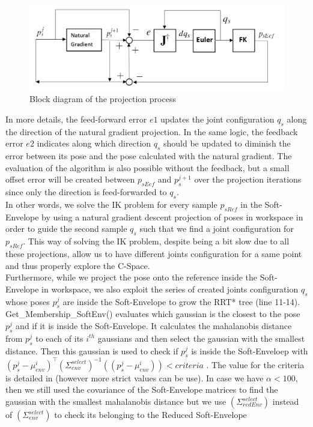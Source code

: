 \documentclass[letterpaper, 10 pt, conference]{ieeeconf}  %
\newcommand{\trsp}{{\!\scriptscriptstyle\top}}
\begin{document}
\begin{figure}[h]
	\centering
	\includegraphics[scale=0.35]{figure/loopControl.png}
	\caption{Block diagram of the projection process}
	\label{loopControl}
\end{figure}

In more details, the feed-forward error $e1$ updates the joint configuration $q_s$ along the direction of the natural gradient projection. In the same logic, the feedback error $e2$ indicates along which direction $q_s$ should be updated to diminish the error between its pose and the pose calculated with the natural gradient. The evaluation of the algorithm is also possible without the feedback, but a small offset error will be created between $p_{sEef}$ and $p_s^{j+1}$ over the projection iterations since only the direction is feed-forwarded to $q_s$. \\
 In other words, we solve the IK problem for every sample  $p_{sRef}$ in the Soft-Envelope by using a natural gradient descent projection of poses in workspace in order to guide the second sample $q_s$ such that we find a joint configuration for $p_{sRef}$. This way of solving the IK problem, despite being a bit slow due to all these projections, allow us to have different joints configuration for a same point and thus properly explore the C-Space.\\
Furthermore, while we project the pose onto the reference inside the Soft-Envelope in workspace, we also exploit the series of created joints configuration $q_s$ whose poses $p_s^j$ are inside the Soft-Envelope to grow the RRT* tree (line 11-14).\\
{\selectfont Get\_Membership\_SoftEnv()} evaluates which gaussian is the closest to the pose $p_s^j$ and if it is inside the Soft-Envelope. It calculates the mahalanobis distance from $p_s^j$  to each of its $i^{th}$ gaussians and then select the gaussian with the smallest distance. Then this gaussian is used to check if $p_s^j$ is inside the Soft-Enveloep with $(p_s^j-\mu_{env}^i)^{\trsp}(\Sigma_{env}^{select})^{-1} ((p_s^j-\mu_{env}^i)) < criteria$ . The value for the criteria is detailed in \cite{Filzmoser04amultivariate} (however more strict values can be use). In case we have $\alpha<100$, then we still used the covariance of the Soft-Envelope matrices to find the gaussian with the smallest mahalanobis distance but we use $(\Sigma_{redEnv}^{select})$ instead of $(\Sigma_{env}^{select})$ to check its belonging to the Reduced Soft-Envelope\\
\end{document}
